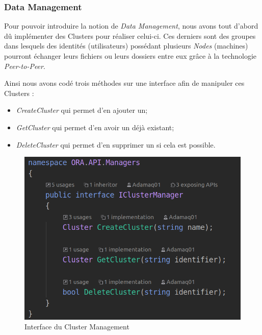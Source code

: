 \documentclass[11pt, a4paper]{report}
\begin{document}
    \clearpage

      \subsubsection{Data Management}
        Pour pouvoir introduire la notion de \textit{Data Management}, nous avons tout d'abord dû implémenter des Clusters pour réaliser celui-ci.\newline
        Ces derniers sont des groupes dans lesquels des identités (utilisateurs) possédant plusieurs \textit{Nodes} (machines) pourront échanger leurs fichiers ou leurs dossiers entre eux grâce à la technologie \textit{Peer-to-Peer}.\newline
        
        Ainsi nous avons codé trois méthodes sur une interface afin de manipuler ces Clusters :
        \begin{itemize}
              \item \textit{CreateCluster} qui permet d'en ajouter un;
              \item \textit{GetCluster} qui permet d'en avoir un déjà existant;
              \item \textit{DeleteCluster} qui permet d'en supprimer un si cela est possible.
          \end{itemize}

          \begin{figure}[H]
            \centering
            \includegraphics[width=15cm]{assets/presentation1/cluster_interface.png}
            \caption{Interface du Cluster Management}
          \end{figure}
          
\end{document}
